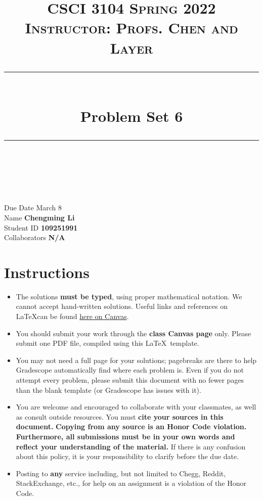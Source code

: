 \documentclass[11pt]{article}
\title{
\normalfont \normalsize 
\textsc{CSCI 3104 Spring 2022 \\ 
Instructor: Profs. Chen and Layer} \\
[10pt] 
\rule{\linewidth}{0.5pt} \\[6pt] 
\huge Problem Set 6 \\
\rule{\linewidth}{2pt}  \\[10pt]
}
\date{}
\theoremstyle{definition}
\theoremstyle{definition}
\theoremstyle{definition}
\begin{document}
\maketitle


\noindent
Due Date \dotfill March 8 \\
Name \dotfill \textbf{Chengming Li} \\
Student ID \dotfill \textbf{109251991} \\
Collaborators \dotfill \textbf{N/A}

\tableofcontents

\section*{Instructions}
 \begin{itemize}
	\item The solutions \textbf{must be typed}, using proper mathematical notation. We cannot accept hand-written solutions. Useful links and references on \LaTeX can be found \href{https://canvas.colorado.edu/courses/75824/pages/latex}{here on Canvas}.
	\item You should submit your work through the \textbf{class Canvas page} only. Please submit one PDF file, compiled using this \LaTeX \ template.
	\item You may not need a full page for your solutions; pagebreaks are there to help Gradescope automatically find where each problem is. Even if you do not attempt every problem, please submit this document with no fewer pages than the blank template (or Gradescope has issues with it).

	\item You are welcome and encouraged to collaborate with your classmates, as well as consult outside resources. You must \textbf{cite your sources in this document.} \textbf{Copying from any source is an Honor Code violation. Furthermore, all submissions must be in your own words and reflect your understanding of the material.} If there is any confusion about this policy, it is your responsibility to clarify before the due date. 

	\item Posting to \textbf{any} service including, but not limited to Chegg, Reddit, StackExchange, etc., for help on an assignment is a violation of the Honor Code.
\end{itemize}
\end{document}
